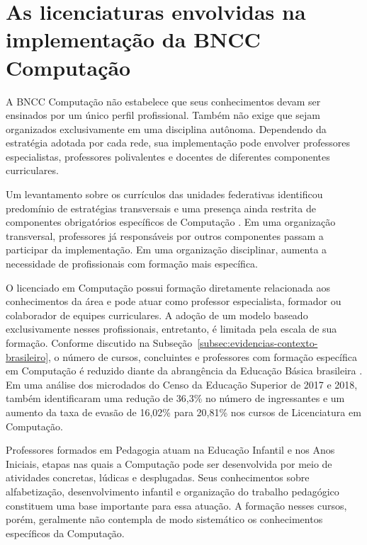 \section{As licenciaturas envolvidas na implementação da BNCC Computação}
\label{sec:diferentes-licenciaturas}

A BNCC Computação não estabelece que seus conhecimentos devam ser ensinados por um único perfil profissional. Também não exige que sejam organizados exclusivamente em uma disciplina autônoma. Dependendo da estratégia adotada por cada rede, sua implementação pode envolver professores especialistas, professores polivalentes e docentes de diferentes componentes curriculares.

Um levantamento sobre os currículos das unidades federativas identificou predomínio de estratégias transversais e uma presença ainda restrita de componentes obrigatórios específicos de Computação \cite{telefonica2025curriculos}. Em uma organização transversal, professores já responsáveis por outros componentes passam a participar da implementação. Em uma organização disciplinar, aumenta a necessidade de profissionais com formação mais específica.

O licenciado em Computação possui formação diretamente relacionada aos conhecimentos da área e pode atuar como professor especialista, formador ou colaborador de equipes curriculares. A adoção de um modelo baseado exclusivamente nesses profissionais, entretanto, é limitada pela escala de sua formação. Conforme discutido na Subseção~\ref{subsec:evidencias-contexto-brasileiro}, o número de cursos, concluintes e professores com formação específica em Computação é reduzido diante da abrangência da Educação Básica brasileira \cite{sbc2025grandesdesafios,sbc2022estatisticas,brasil2026emec}. Em uma análise dos microdados do Censo da Educação Superior de 2017 e 2018,  também identificaram uma redução de 36,3\% no número de ingressantes e um aumento da taxa de evasão de 16,02\% para 20,81\% nos cursos de Licenciatura em Computação.

Professores formados em Pedagogia atuam na Educação Infantil e nos Anos Iniciais, etapas nas quais a Computação pode ser desenvolvida por meio de atividades concretas, lúdicas e desplugadas. Seus conhecimentos sobre alfabetização, desenvolvimento infantil e organização do trabalho pedagógico constituem uma base importante para essa atuação. A formação nesses cursos, porém, geralmente não contempla de modo sistemático os conhecimentos específicos da Computação.

